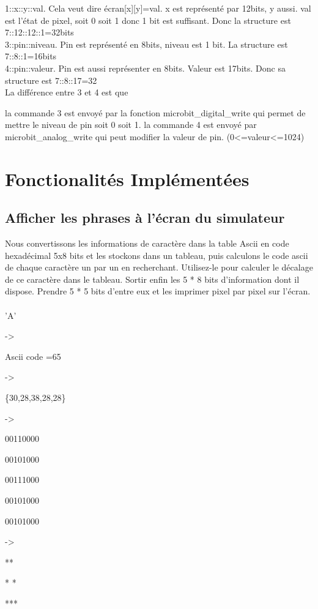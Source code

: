 \documentclass[14px]{article}
\begin{document}
1::x::y::val. Cela veut dire écran[x][y]=val.
 x est représenté par 12bits, y aussi.
val est l'état de pixel, soit 0 soit 1 donc 1 bit est suffisant.  Donc la structure est 7::12::12::1=32bits
~\\

3::pin::niveau. Pin est représenté en 8bits,  niveau est 1 bit. La structure est 7::8::1=16bits
~\\


4::pin::valeur. Pin est aussi représenter en 8bits. Valeur est 17bits. Donc sa structure est 7::8::17=32
~\\

La différence entre 3 et 4 est que

la commande 3 est envoyé par la fonction microbit\_digital\_write qui permet de mettre le niveau de pin soit 0 soit 1.
la commande 4 est envoyé par microbit\_analog\_write qui peut modifier la valeur de pin. (0<=valeur<=1024)


\section{Fonctionalités Implémentées}
\subsection{Afficher les phrases à l'écran du simulateur}
Nous convertissons les informations de caractère dans la table Ascii en code hexadécimal 5x8 bits et les stockons dans un tableau, puis calculons le code ascii de chaque caractère un par un en recherchant. Utilisez-le pour calculer le décalage de ce caractère dans le tableau. Sortir enfin les 5 * 8 bits d'information dont il dispose. Prendre 5 * 5 bits d'entre eux et les imprimer pixel par pixel sur l'écran.
~\\

'A'

->

Ascii code =65

 ->

\{30,28,38,28,28\}

->

00110000

00101000

00111000

00101000

00101000

->

  **

  * *

  ***
\end{document}
